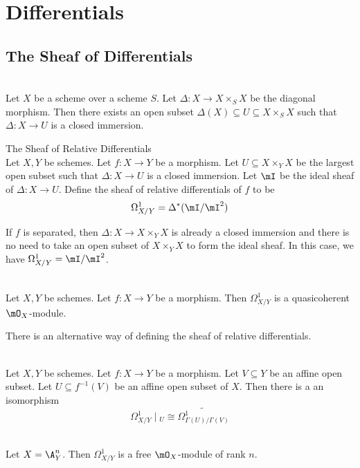 \documentclass[a4paper]{article}
\begin{document}
\pagebreak
\section{Differentials}
\subsection{The Sheaf of Differentials}
\begin{lmm}{}{}\\
Let $X$ be a scheme over a scheme $S$. Let $\Delta:X\to X\times_SX$ be the diagonal morphism. Then there exists an open subset $\Delta(X)\subseteq U\subseteq X\times_SX$ such that $\Delta:X\to U$ is a closed immersion. 
\end{lmm}

\begin{defn}{The Sheaf of Relative Differentials}{}\\
Let $X,Y$ be schemes. Let $f:X\to Y$ be a morphism. Let $U\subseteq X\times_YX$ be the largest open subset such that $\Delta:X\to U$ is a closed immersion. Let $\mI$ be the ideal sheaf of $\Delta:X\to U$. Define the sheaf of relative differentials of $f$ to be $$\Omega_{X/Y}^1=\Delta^\ast(\mI/\mI^2)$$
\end{defn}

If $f$ is separated, then $\Delta:X\to X\times_YX$ is already a closed immersion and there is no need to take an open subset of $X\times_YX$ to form the ideal sheaf. In this case, we have $\Omega_{X/Y}^1=\mI/\mI^2$. \\

\begin{lmm}{}{}\\
Let $X,Y$ be schemes. Let $f:X\to Y$ be a morphism. Then $\Omega_{X/Y}^1$ is a quasicoherent $\mO_X$-module. 
\end{lmm}

There is an alternative way of defining the sheaf of relative differentials. 

\begin{lmm}{}{}\\
Let $X,Y$ be schemes. Let $f:X\to Y$ be a morphism. Let $V\subseteq Y$ be an affine open subset. Let $U\subseteq f^{-1}(V)$ be an affine open subset of $X$. Then there is a an isomorphism $$\Omega_{X/Y}^1\;|\;_U\cong\widetilde{\Omega_{\Gamma(U)/\Gamma(V)}^1}$$
\end{lmm}

\begin{eg}{}{}\\
Let $X=\A_Y^n$. Then $\Omega_{X/Y}^1$ is a free $\mO_X$-module of rank $n$. 
\end{eg}
\end{document}
